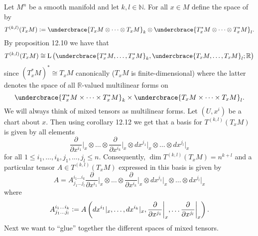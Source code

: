 Let $M^n$ be a smooth manifold and let $k,l \in \mathbb{N}$. For all $x \in M$ define the space of  by
\begin{equation*}
	T^{(k,l)}(T_xM) := \undercbrace{T_xM \otimes \dots \otimes T_xM}_{k} \otimes \undercbrace{T^*_xM \otimes \dots \otimes T^*_xM}_{l}.
\end{equation*}
By proposition 12.10 \cite[311]{lee:smooth_manifolds:2013} we have that 
\begin{equation*}
	T^{(k,l)}(T_xM) \cong \mathrm{L}\del[1]{\undercbrace{T^*_xM, \dots, T^*_xM}_{k},\undercbrace{T_xM,\dots,T_xM}_{l};\mathbb{R}}
\end{equation*}
\noindent since $(T^*_xM)^* \cong T_xM$ canonically ($T_xM$ is finite-dimensional) where the latter denotes the space of all $\mathbb{R}$-valued multilinear forms on
\begin{equation*}
	\undercbrace{T^*_xM \times \dots \times T^*_xM}_{k} \times \undercbrace{T_xM \times \dots \times T_xM}_{l}.
\end{equation*}
We will always think of mixed tensors as multilinear forms. Let $(U,x^i)$ be a chart about $x$. Then using corollary 12.12 \cite[313]{lee:smooth_manifolds:2013} we get that a basis for $T^{(k,l)}(T_xM)$ is given by all elements 
\begin{equation*}
	\frac{\partial}{\partial x^{i_1}}\bigg\vert_x \otimes \dots \otimes \frac{\partial}{\partial x^{i_k}}\bigg\vert_x \otimes dx^{j_1}\vert_x \otimes \dots \otimes dx^{j_l}\vert_x
\end{equation*}
\noindent for all $1 \leq i_1,\dots,i_k,j_1,\dots,j_l \leq n$. Consequently, $\dim T^{(k,l)}(T_xM) = n^{k + l}$ and a particular tensor $A \in T^{(k,l)}(T_xM)$ expressed in this basis is given by 
\begin{equation}
	\label{eq:tensor_expression_basis}
	A = A^{i_1\dots i_k}_{j_1\dots j_l}\frac{\partial}{\partial x^{i_1}}\bigg\vert_x \otimes \dots \otimes \frac{\partial}{\partial x^{i_k}}\bigg\vert_x \otimes dx^{j_1}\vert_x \otimes \dots \otimes dx^{j_l}\vert_x
\end{equation}
\noindent where
\begin{equation}
	\label{eq:tensor_components}
	A^{i_1\dots i_k}_{j_1\dots j_l} := A\del[3]{dx^{i_1}\vert_x,\dots,dx^{i_k}\vert_x,\frac{\partial}{\partial x^{j_1}}\bigg\vert_x,\dots\frac{\partial}{\partial x^{j_l}}\bigg\vert_x}.
\end{equation}
Next we want to ``glue'' together the different spaces of mixed tensors. 

